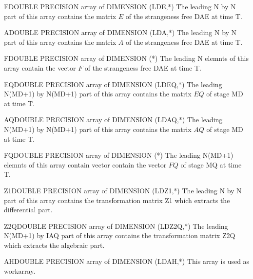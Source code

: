 \begin{entry}{E}{DOUBLE PRECISION array of DIMENSION (LDE,*)}
  The leading N by N part of this array contains the matrix
  $E$ of the strangeness free DAE at time T.
\end{entry}

\begin{entry}{A}{DOUBLE PRECISION array of DIMENSION (LDA,*)}
  The leading N by N part of this array contains the matrix
  $A$ of the strangeness free DAE at time T.
\end{entry}

\begin{entry}{F}{DOUBLE PRECISION array of DIMENSION (*)}
  The leading N elemnts of this array contain the vector $F$ of the
  strangeness free DAE at time T.
\end{entry}

\begin{entry}{EQ}{DOUBLE PRECISION array of DIMENSION (LDEQ,*)}
  The leading N(MD+1) by N(MD+1) part of this array contains the
  matrix $EQ$ of stage MD at time T.
\end{entry}

\begin{entry}{AQ}{DOUBLE PRECISION array of DIMENSION (LDAQ,*)}
  The leading N(MD+1) by N(MD+1) part of this array contains the
  matrix $AQ$ of stage MD at time T.
\end{entry}

\begin{entry}{FQ}{DOUBLE PRECISION array of DIMENSION (*)}
  The leading N(MD+1) elemnts of this array contain vector contain the
  vector $FQ$ of stage MQ at time T.
\end{entry}

\begin{entry}{Z1}{DOUBLE PRECISION array of DIMENSION (LDZ1,*)}
  The leading N by N part of this array contains the transformation
  matrix Z1 which extracts the differential part.
\end{entry}

\begin{entry}{Z2Q}{DOUBLE PRECISION array of DIMENSION (LDZ2Q,*)}
  The leading N(MD+1) by IAQ part of this array contains the
  transformation matrix Z2Q which extracts the algebraic part.
\end{entry}

\begin{entry}{AH}{DOUBLE PRECISION array of DIMENSION (LDAH,*)}
  This array is used as workarray.
\end{entry}

